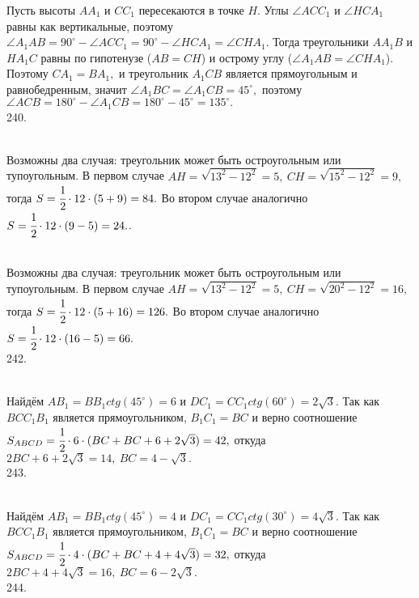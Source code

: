 Пусть высоты $AA_1$ и $CC_1$ пересекаются в точке $H.$ Углы $\angle ACC_1$ и $\angle HCA_1$ равны как вертикальные, поэтому $\angle A_1AB=90^\circ-\angle ACC_1=90^\circ-\angle HCA_1=\angle CHA_1.$ Тогда треугольники $AA_1B$ и $HA_1C$ равны по гипотенузе ($AB=CH$) и острому углу ($\angle A_1AB=\angle CHA_1$). Поэтому $CA_1=BA_1,$ и треугольник $A_1CB$ является прямоугольным и равнобедренным, значит $\angle A_1BC=\angle A_1CB=45^\circ,$ поэтому $\angle ACB=180^\circ-\angle A_1CB=180^\circ-45^\circ=135^\circ.$\\
240. \begin{figure}[ht!]
\end{figure}\\
Возможны два случая: треугольник может быть остроугольным или тупоугольным. В первом случае $AH=\sqrt{13^2-12^2}=5,\ CH=\sqrt{15^2-12^2}=9,$ тогда $S=\cfrac{1}{2}\cdot12\cdot(5+9)=84.$ Во втором случае аналогично $S=\cfrac{1}{2}\cdot12\cdot(9-5)=24.$\newpage{}. \begin{figure}[ht!]
\end{figure}\\
Возможны два случая: треугольник может быть остроугольным или тупоугольным. В первом случае $AH=\sqrt{13^2-12^2}=5,\ CH=\sqrt{20^2-12^2}=16,$ тогда $S=\cfrac{1}{2}\cdot12\cdot(5+16)=126.$ Во втором случае аналогично $S=\cfrac{1}{2}\cdot12\cdot(16-5)=66.$\\
242. \begin{figure}[ht!]
\end{figure}\\
Найдём $AB_1=BB_1 ctg(45^\circ)=6$ и $DC_1=CC_1 ctg(60^\circ)=2\sqrt{3}.$ Так как $BCC_1B_1$ является прямоугольником, $B_1C_1=BC$ и верно соотношение
$S_{ABCD}=\cfrac{1}{2}\cdot6\cdot(BC+BC+6+2\sqrt{3})=42,$ откуда $2BC+6+2\sqrt{3}=14,\ BC=4-\sqrt{3}.$\\
243. \begin{figure}[ht!]
\end{figure}\\
Найдём $AB_1=BB_1 ctg(45^\circ)=4$ и $DC_1=CC_1 ctg(30^\circ)=4\sqrt{3}.$ Так как $BCC_1B_1$ является прямоугольником, $B_1C_1=BC$ и верно соотношение
$S_{ABCD}=\cfrac{1}{2}\cdot4\cdot(BC+BC+4+4\sqrt{3})=32,$ откуда $2BC+4+4\sqrt{3}=16,\ BC=6-2\sqrt{3}.$\\
244. \begin{figure}[ht!]
\end{figure}\\

